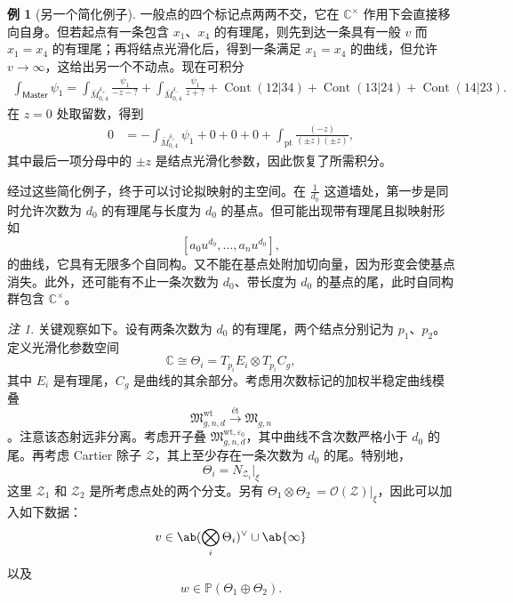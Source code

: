 \documentclass{amsart}
\theoremstyle{definition}
\newtheorem{exm}[thm]{例}
\theoremstyle{remark}
\newtheorem{rmk}[thm]{注}
\theoremstyle{plain}
\theoremstyle{definition}
\theoremstyle{remark}
\newcommand{\C}{\mathbb{C}}
\renewcommand{\P}{\mathbb{P}}
\newcommand{\ep}{\varepsilon}
\newcommand{\mc}[1]{\mathcal{#1}}
\newcommand{\mf}[1]{\mathfrak{#1}}
\newcommand{\mr}[1]{\mathrm{#1}}
\newcommand{\on}[1]{\operatorname{#1}}
\newcommand{\ms}[1]{\mathsf{#1}}
\newcommand{\1}{\mathbf{1}}
\newcommand{\2}{\mathbf{2}}
\newcommand{\3}{\mathbf{3}}
\begin{document}
\begin{exm}[另一个简化例子]
    一般点的四个标记点两两不交，它在 \(\C^{\times}\) 作用下会直接移向自身。但若起点有一条包含 \(x_1\)、\(x_4\) 的有理尾，则先到达一条具有一般 \(v\) 而 \(x_1 = x_4\) 的有理尾；再将结点光滑化后，得到一条满足 \(x_1 = x_4\) 的曲线，但允许 \(v \to \infty\)，这给出另一个不动点。现在可积分
    {\small
\begin{align*}
        \int_{\ms{Master}} \psi_1 = \int_{\bar{M}_{0,4}^{\delta_+}} \frac{\psi_1}{-z-?} + \int_{\bar{M}_{0,4}^{\delta_-}} \frac{\psi_1}{z+?} + \on{Cont}(12|34) + \on{Cont}(13|24) + \on{Cont}(14|23).
    \end{align*}
}
    在 \(z = 0\) 处取留数，得到
    \begin{align*}
        0 &= - \int_{\bar{M}_{0,4}^{\delta_+}} \psi_1 + 0 + 0 + 0 + \int_{\mr{pt}} \frac{(-z)}{(\pm z)(\pm z)},
    \end{align*}
    其中最后一项分母中的 \(\pm z\) 是结点光滑化参数，因此恢复了所需积分。
\end{exm}

经过这些简化例子，终于可以讨论拟映射的主空间。在 \(\frac{1}{d_0}\) 这道墙处，第一步是同时允许次数为 \(d_0\) 的有理尾与长度为 \(d_0\) 的基点。但可能出现带有理尾且拟映射形如
\[ [a_0 u^{d_0}, \ldots, a_n u^{d_0}], \]
的曲线，它具有无限多个自同构。又不能在基点处附加切向量，因为形变会使基点消失。此外，还可能有不止一条次数为 \(d_0\)、带长度为 \(d_0\) 的基点的尾，此时自同构群包含 \(\C^{\times}\)。

\begin{rmk}
    关键观察如下。设有两条次数为 \(d_0\) 的有理尾，两个结点分别记为 \(p_1\)、\(p_2\)。定义光滑化参数空间
    \[ \C \cong \Theta_i = T_{p_i} E_i \otimes T_{p_i} C_g, \]
    其中 \(E_i\) 是有理尾，\(C_g\) 是曲线的其余部分。考虑用次数标记的加权半稳定曲线模叠
    \[ \mf{M}_{g,n,d}^{\mr{wt}} \xrightarrow{\text{\'et}} \mf{M}_{g,n} \]
    。注意该态射远非分离。考虑开子叠 \(\mf{M}_{g,n,d}^{\mr{wt}, \ep_0}\)，其中曲线不含次数严格小于 \(d_0\) 的尾。再考虑 Cartier 除子 \(\mc{Z}\)，其上至少存在一条次数为 \(d_0\) 的尾。特别地，
    \[ \Theta_i = N_{\mc{Z}_i} |_{\xi} \]
    这里 \(\mc{Z}_1\) 和 \(\mc{Z}_2\) 是所考虑点处的两个分支。另有 \(\Theta_1 \otimes \Theta_2\ = \mc{O}(\mc{Z})|_{\xi}\)，因此可以加入如下数据：
    \[ v \in \ab(\bigotimes_i \Theta_i)^{\vee} \cup \ab\{\infty\} \]
    以及
    \[ w \in \P(\Theta_1 \oplus\Theta_2). \]
\end{rmk}
\end{document}
